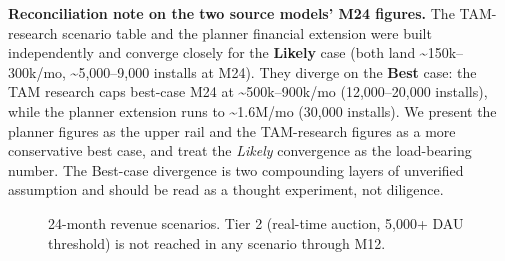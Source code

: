 \textbf{Reconciliation note on the two source models' M24 figures.} The TAM-research scenario table and the planner financial extension were built independently and converge closely for the \textbf{Likely} case (both land \textasciitilde \textrm{\textrupee}150k--300k/mo, \textasciitilde 5,000--9,000 installs at M24). They diverge on the \textbf{Best} case: the TAM research caps best-case M24 at \textasciitilde \textrm{\textrupee}500k--900k/mo (12,000--20,000 installs), while the planner extension runs to \textasciitilde \textrm{\textrupee}1.6M/mo (30,000 installs). We present the planner figures as the upper rail and the TAM-research figures as a more conservative best case, and treat the \emph{Likely} convergence as the load-bearing number. The Best-case divergence is two compounding layers of unverified assumption and should be read as a thought experiment, not diligence.

\begin{figure}[htbp]
\centering
{}
\caption{24-month revenue scenarios. Tier 2 (real-time auction, 5,000+ DAU threshold) is not reached in any scenario through M12.}
\label{fig:revenue-scenarios}
\end{figure}

